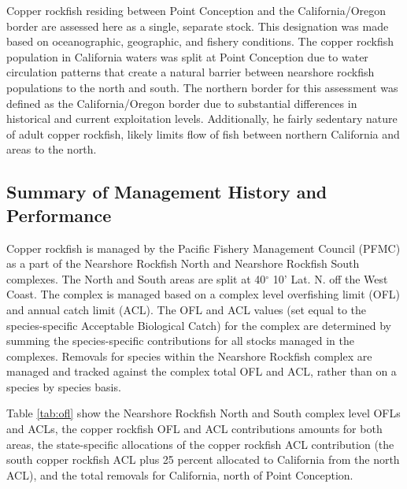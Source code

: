 \documentclass[11pt,
  english,
  a4paper,
]{article}
\begin{document}
Copper rockfish residing between Point Conception and the California/Oregon border are assessed here as a single, separate stock. This designation was made based on oceanographic, geographic, and fishery conditions. The copper rockfish population in California waters was split at Point Conception due to water circulation patterns that create a natural barrier between nearshore rockfish populations to the north and south. The northern border for this assessment was defined as the California/Oregon border due to substantial differences in historical and current exploitation levels. Additionally, he fairly sedentary nature of adult copper rockfish, likely limits flow of fish between northern California and areas to the north.

\leavevmode\tagmcend\tagstructend\par


\hypertarget{summary-of-management-history-and-performance}{%
\subsection{Summary of Management History and Performance}\label{summary-of-management-history-and-performance}}

\leavevmode\tagmcend\tagstructend


Copper rockfish is managed by the Pacific Fishery Management Council (PFMC) as a part of the Nearshore Rockfish North and Nearshore Rockfish South complexes. The North and South areas are split at 40{\(^\circ\)\leavevmode\tagmcend\tagstructend} 10' Lat. N. off the West Coast. The complex is managed based on a complex level overfishing limit (OFL) and annual catch limit (ACL). The OFL and ACL values (set equal to the species-specific Acceptable Biological Catch) for the complex are determined by summing the species-specific contributions for all stocks managed in the complexes. Removals for species within the Nearshore Rockfish complex are managed and tracked against the complex total OFL and ACL, rather than on a species by species basis.

\leavevmode\tagmcend\tagstructend\par


Table \ref{tab:ofl} show the Nearshore Rockfish North and South complex level OFLs and ACLs, the copper rockfish OFL and ACL contributions amounts for both areas, the state-specific allocations of the copper rockfish ACL contribution (the south copper rockfish ACL plus 25 percent allocated to California from the north ACL), and the total removals for California, north of Point Conception.
\end{document}
